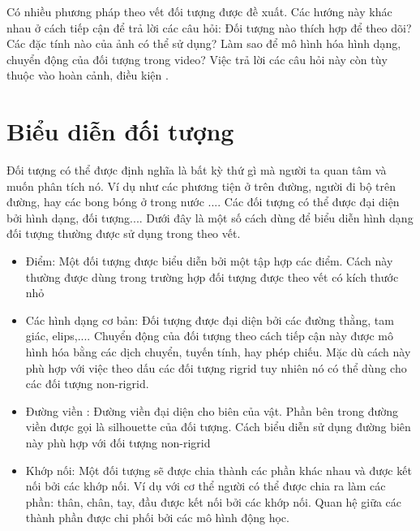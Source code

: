 \documentclass[12pt, oneside, a4]{book}
\begin{document}
Có nhiều phương pháp theo vết đối tượng được đề xuất. Các hướng này khác nhau ở cách tiếp cận để trả lời các câu hỏi: Đối tượng nào thích hợp để theo dõi? Các đặc tính nào của ảnh có thể sử dụng? Làm sao để mô hình hóa hình dạng, chuyển động của đối tượng trong video? Việc trả lời các câu hỏi này còn tùy thuộc vào hoàn cảnh, điều kiện .
\section{Biểu diễn đối tượng }
Đối tượng có thể được định nghĩa là bất kỳ thứ gì mà người ta quan tâm và muốn phân tích nó. Ví dụ như các phương tiện ở trên đường, người đi bộ trên đường, hay các bong bóng ở trong nước .... Các đối tượng có thể được đại diện bởi hình dạng, đối tượng.... Dưới đây là một số cách dùng để biểu diễn hình dạng đối tượng thường được sử dụng trong  theo vết. 
\begin{itemize}
\item Điểm: Một đối tượng được biểu diễn bởi một tập hợp các điểm. Cách này thường được dùng trong trường hợp đối tượng được theo vết có kích thước nhỏ
\item Các hình dạng cơ bản: Đối tượng được đại diện bởi các đường thằng, tam giác, elips,.... Chuyển động của đối tượng theo cách tiếp cận này được mô hình hóa bằng các dịch chuyển, tuyến tính, hay phép chiếu. Mặc dù cách này phù hợp với việc theo dấu các đối tượng rigrid tuy nhiên nó có thể dùng cho các đối tượng non-rigrid.
\item Đường viền : Đường viền đại diện cho biên của vật. Phần bên trong đường viền được gọi là silhouette của đối tượng. Cách biểu diễn sử dụng đường biên này phù hợp với đối tượng non-rigrid
\item Khớp nối: Một đối tượng sẽ được chia thành các phần khác nhau và được kết nối bởi các khớp nối. Ví dụ với cơ thể người có thể được chia ra làm các phần: thân, chân, tay,  đầu được kết nối bởi các khớp nối. Quan hệ giữa các thành phần được chi phối bởi các mô hình động học.
\end{itemize}
\end{document}
